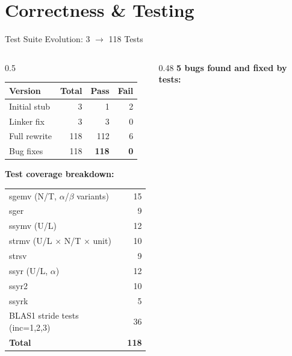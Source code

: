 \documentclass[aspectratio=169,10pt]{beamer}
\begin{document}
\section{Correctness \& Testing}

\begin{frame}{Test Suite Evolution: 3 $\to$ 118 Tests}
  \begin{columns}
    \begin{column}{0.5\textwidth}
      \begin{center}
      \begin{tabular}{lrrr}
        \toprule
        Version & Total & Pass & Fail \\
        \midrule
        Initial stub & 3 & 1 & 2 \\
        Linker fix & 3 & 3 & 0 \\
        Full rewrite & 118 & 112 & 6 \\
        Bug fixes & 118 & \textbf{118} & \textbf{0} \\
        \bottomrule
      \end{tabular}
      \end{center}
      \vspace{0.5em}
      \textbf{Test coverage breakdown:}\\[0.2em]
      \footnotesize
      \begin{tabular}{lr}
        sgemv (N/T, $\alpha$/$\beta$ variants) & 15 \\
        sger  & 9 \\
        ssymv (U/L) & 12 \\
        strmv (U/L $\times$ N/T $\times$ unit) & 10 \\
        strsv & 9 \\
        ssyr (U/L, $\alpha$) & 12 \\
        ssyr2 & 10 \\
        ssyrk & 5 \\
        BLAS1 stride tests (inc=1,2,3) & 36 \\
        \midrule
        \textbf{Total} & \textbf{118} \\
      \end{tabular}
    \end{column}
    \begin{column}{0.48\textwidth}
      \textbf{5 bugs found and fixed by tests:}
      \begin{enumerate}

\end{enumerate}
\end{column}
\end{columns}
\end{frame}
\end{document}
